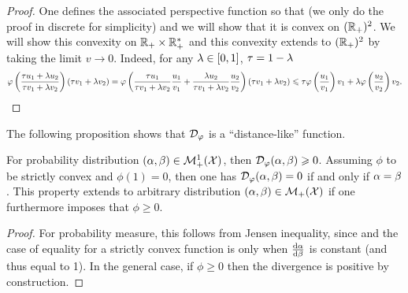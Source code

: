 \begin{proof} 
	One defines the associated perspective function 
	so that (we only do the proof in discrete for simplicity)
	and we will show that it is convex on $(\mathbb{R}_+)^2$. We will show this convexity on $\mathbb{R}_+ \times \mathbb{R}_+^*$ and this convexity extends to $(\mathbb{R}_+)^2$ by taking the limit $v \rightarrow 0$.
	Indeed, for any $\lambda \in [0,1]$,  $\tau=1-\lambda$
	\begin{align*}
		\varphi\left(  \frac{\tau u_1 + \lambda u_2}{\tau v_1 + \lambda v_2}  \right)
		(\tau v_1 + \lambda v_2) 
		= 
		\varphi\left(  
			 	\frac{\tau u_1 }{\tau v_1 + \lambda v_2} \frac{u_1}{v_1}+
				\frac{\lambda u_2 }{\tau v_1 + \lambda v_2} \frac{u_2}{v_2}		
		 \right)
		(\tau v_1 + \lambda v_2)
		\leqslant 
		\tau \varphi\left( \frac{u_1}{v_1} \right) v_1 
		+ 
		\lambda \varphi\left( \frac{u_2}{v_2} \right) v_2 .
	\end{align*}
\end{proof} 

The following proposition shows that $\mathcal{D}_\varphi$ is a ``distance-like'' function.

\begin{proposition}\label{phi-div-positive}
For probability distribution $(\alpha,\beta) \in \mathcal{M}_+^1(\mathcal{X})$, then $\mathcal{D}_\varphi(\alpha,\beta) \geqslant 0$. Assuming $\phi$ to be strictly convex and $\phi(1)=0$, then one has $\mathcal{D}_\varphi(\alpha,\beta)=0$ if and only if $\alpha=\beta$.
%
This property extends to arbitrary distribution $(\alpha,\beta) \in \mathcal{M}_+(\mathcal{X})$ if one furthermore imposes that $\phi \geq 0$. 
\end{proposition}

\begin{proof} 
	For probability measure, this follows from Jensen inequality, since
	and the case of equality for a strictly convex function is only when $\frac{\mathrm{d}\alpha}{\mathrm{d}\beta}$ is constant (and thus equal to 1).
	In the general case, if $\phi \geq 0$ then the divergence is positive by construction. 
\end{proof} 

